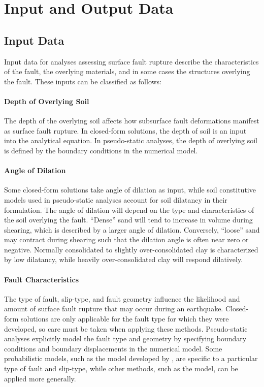 \section{Input and Output Data}
\label{sec:eq_surface_rup_input_output}

\subsection{Input Data}

Input data for analyses assessing surface fault rupture describe the characteristics of the fault, the overlying materials, and in some cases the structures overlying the fault. These inputs can be classified as follows:

\paragraph{Depth of Overlying Soil}
The depth of the overlying soil affects how subsurface fault deformations manifest as surface fault rupture. In closed-form solutions, the depth of soil is an input into the analytical equation. In pseudo-static analyses, the depth of overlying soil is defined by the boundary conditions in the numerical model.

\paragraph{Angle of Dilation}
Some closed-form solutions take angle of dilation as input, while soil constitutive models used in pseudo-static analyses account for soil dilatancy in their formulation. The angle of dilation will depend on the type and characteristics of the soil overlying the fault. ``Dense'' sand will tend to increase in volume during shearing, which is described by a larger angle of dilation. Conversely, ``loose'' sand may contract during shearing such that the dilation angle is often near zero or negative. Normally consolidated to slightly over-consolidated clay is characterized by low dilatancy, while heavily over-consolidated clay will respond dilatively.

\paragraph{Fault Characteristics}
The type of fault, slip-type, and fault geometry influence the likelihood and amount of surface fault rupture that may occur during an earthquake. Closed-form solutions are only applicable for the fault type for which they were developed, so care must be taken when applying these methods. Pseudo-static analyses explicitly model the fault type and geometry by specifying boundary conditions and boundary displacements in the numerical model. Some probabilistic models, such as the model developed by \citet{moss2011probabilistic}, are specific to a particular type of fault and slip-type, while other methods, such as the \citet{hecker2013variability} model, can be applied more generally.

